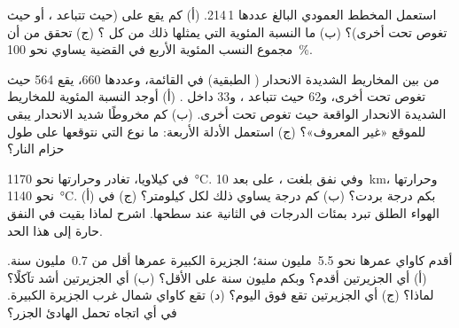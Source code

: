 \begin{exercise}[$\star\star$]\label{exo:g7:volcanoes:5}
استعمل المخطط العمودي  البالغ عددها 1\,214. (أ) كم  يقع على
 (حيث تتباعد ، أو حيث تغوص  تحت
أخرى)؟ (ب) ما النسبة المئوية التي يمثلها ذلك من كل ؟ (ج) تحقق من أن
مجموع النسب المئوية الأربع في القضية يساوي نحو 100~\%.
\end{exercise}

\begin{exercise}[$\star\star$]\label{exo:g7:volcanoes:6}
من بين المخاريط الشديدة الانحدار ( الطبقية) في القائمة، وعددها 660، يقع 564 حيث تغوص
 تحت أخرى، و62 حيث تتباعد ، و33 داخل
. (أ) أوجد النسبة المئوية للمخاريط الشديدة الانحدار الواقعة حيث تغوص 
تحت أخرى. (ب) كم مخروطًا شديد الانحدار يبقى للموقع «غير
المعروف»؟ (ج) استعمل الأدلة الأربعة: ما نوع  التي نتوقعها
على طول حزام النار؟
\end{exercise}

\begin{exercise}[$\star\star$]\label{exo:g7:volcanoes:7}
في كيلاويا، تغادر   وحرارتها نحو \qty{1170}{\degreeCelsius}. وفي
نفق  بلغت ، على بعد \qty{10}{km}، وحرارتها نحو
\qty{1140}{\degreeCelsius}. (أ) بكم درجة بردت؟ (ب) كم
درجة يساوي ذلك لكل كيلومتر؟ (ج)  في الهواء الطلق تبرد بمئات
الدرجات في الثانية عند سطحها. اشرح لماذا بقيت  في
النفق حارة إلى هذا الحد.
\end{exercise}

\begin{exercise}[$\star\star$]\label{exo:g7:volcanoes:8}
أقدم  كاواي عمرها نحو 5.5~مليون سنة؛  الجزيرة
الكبيرة عمرها أقل من 0.7~مليون سنة. (أ) أي الجزيرتين أقدم؟ وبكم مليون سنة على
الأقل؟ (ب) أي الجزيرتين أشد تآكلًا؟ لماذا؟
(ج) أي الجزيرتين تقع فوق  اليوم؟ (د) تقع كاواي شمال غرب
الجزيرة الكبيرة. في أي اتجاه تحمل   الهادئ
الجزر؟
\end{exercise}

